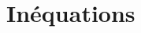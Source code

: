 \chapter{Inéquations}

\exercicesbase
\begin{colonne*exercice}

\end{colonne*exercice}

\connaissances


\pagebreak



